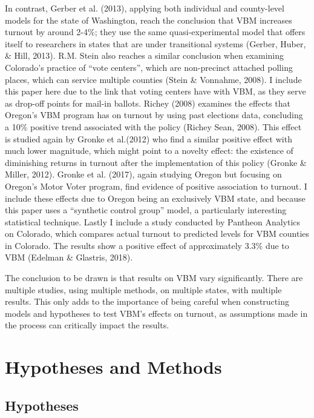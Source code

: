 \documentclass[12pt,twoside]{reedthesis}
\begin{document}
  In contrast, Gerber et al. (2013), applying both individual and
  county-level models for the state of Washington, reach the conclusion
  that VBM increases turnout by around 2-4\%; they use the same
  quasi-experimental model that offers itself to researchers in states
  that are under transitional systems (Gerber, Huber, \& Hill, 2013). R.M.
  Stein also reaches a similar conclusion when examining Colorado's
  practice of ``vote centers'', which are non-precinct attached polling
  places, which can service multiple counties (Stein \& Vonnahme, 2008). I
  include this paper here due to the link that voting centers have with
  VBM, as they serve as drop-off points for mail-in ballots. Richey (2008)
  examines the effects that Oregon's VBM program has on turnout by using
  past elections data, concluding a 10\% positive trend associated with
  the policy (Richey Sean, 2008). This effect is studied again by Gronke
  et al.(2012) who find a similar positive effect with much lower
  magnitude, which might point to a novelty effect: the existence of
  diminishing returns in turnout after the implementation of this policy
  (Gronke \& Miller, 2012). Gronke et al. (2017), again studying Oregon
  but focusing on Oregon's Motor Voter program, find evidence of positive
  association to turnout. I include these effects due to Oregon being an
  exclusively VBM state, and because this paper uses a ``synthetic control
  group'' model, a particularly interesting statistical technique. Lastly
  I include a study conducted by Pantheon Analytics on Colorado, which
  compares actual turnout to predicted levels for VBM counties in
  Colorado. The results show a positive effect of approximately 3.3\% due
  to VBM (Edelman \& Glastris, 2018).
  
  The conclusion to be drawn is that results on VBM vary significantly.
  There are multiple studies, using multiple methods, on multiple states,
  with multiple results. This only adds to the importance of being careful
  when constructing models and hypotheses to test VBM's effects on
  turnout, as assumptions made in the process can critically impact the
  results.
  
  \chapter{Hypotheses and Methods}\label{hypotheses-and-methods}
  
  \section{Hypotheses}\label{hypotheses}
  
\end{document}
